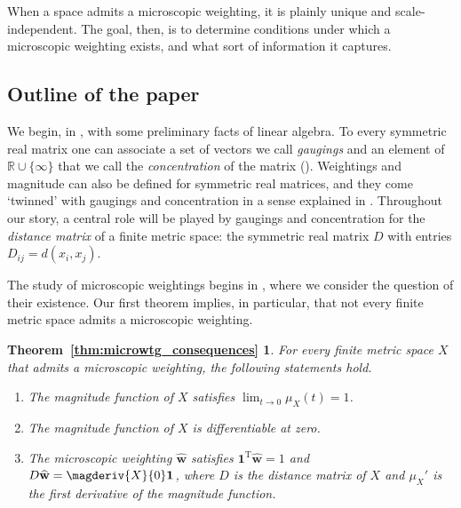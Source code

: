 \documentclass[a4paper, oneside, reqno]{amsart}
\newtheorem*{thmmicrowtg_consequences}
{Theorem~\ref{thm:microwtg_consequences}}
\theoremstyle{definition}
\theoremstyle{remark}
\numberwithin{equation}{section}
\newcommand{\demph}[1]{\emph{#1}}
\renewcommand{\vec}{\mathbf}
\newcommand{\onevector}{\mathbf{1}}
\newcommand{\transpose}{\mathrm{T}}
\newcommand{\R}{\mathbb{R}}
\newcommand{\micro}{\widehat{\vec{w}}}
\begin{document}
When a space admits a microscopic weighting, it is plainly unique and scale-independent. The goal, then, is to determine conditions under which a microscopic weighting exists, and what sort of information it captures.


\subsection{Outline of the paper}

We begin, in , with some preliminary facts of linear algebra. To every symmetric real matrix one can associate a set of vectors we call \demph{gaugings} and an element of \(\R \cup \{\infty\}\) that we call the \demph{concentration} of the matrix (). Weightings and magnitude can also be defined for symmetric real matrices, and they come `twinned' with gaugings and concentration in a sense explained in .  Throughout our story, a central role will be played by gaugings and concentration for the \demph{distance matrix} of a finite metric space: the symmetric real matrix \(D\) with entries \(D_{ij} = d(x_i,x_j)\).

The study of microscopic weightings begins in , where we consider the question of their existence. Our first theorem implies, in particular, that not every finite metric space admits a microscopic weighting.

\begin{thmmicrowtg_consequences}
    For every finite metric space \(X\) that admits a microscopic weighting, the following statements hold.
    \begin{enumerate}
        \item
        \label{intro:microwtg_consequences_1}
        The magnitude function of \(X\) satisfies \(\lim_{t \to 0} \mu_X(t) = 1\).
        
        \item
        \label{intro:microwtg_consequences_2}
        The magnitude function of \(X\) is differentiable at zero.

        \item
        \label{intro:thmmicrowtg_consequences_3}
        The microscopic weighting \(\micro\) satisfies
        \(\onevector^\transpose \micro = 1\) and \(D \micro = \magderiv{X}{0} \onevector\), where \(D\) is the distance matrix of \(X\) and \(\mu_X'\) is the first derivative of the magnitude function.
    \end{enumerate}
\end{thmmicrowtg_consequences}
\end{document}
